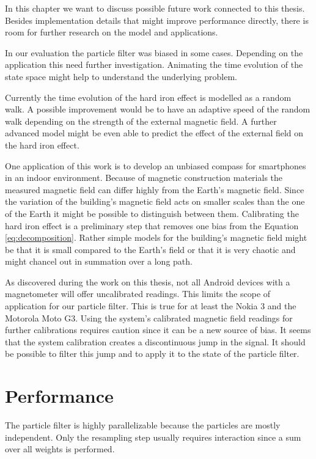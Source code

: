 In this chapter we want to discuss possible future work connected to this thesis. Besides implementation details that might improve performance directly, there is room for further research on the model and applications.

In our evaluation the particle filter was biased in some cases. Depending on the application this need further investigation. Animating the time evolution of the state space might help to understand the underlying problem.

Currently the time evolution of the hard iron effect is modelled as a random walk. A possible improvement would be to have an adaptive speed of the random walk depending on the strength of the external magnetic field. A further advanced model might be even able to predict the effect of the external field on the hard iron effect.

One application of this work is to develop an unbiased compass for smartphones in an indoor environment. Because of magnetic construction materials the measured magnetic field can differ highly from the Earth's magnetic field. Since the variation of the building's magnetic field acts on smaller scales than the one of the Earth it might be possible to distinguish between them. Calibrating the hard iron effect is a preliminary step that removes one bias from the Equation \ref{eq:decomposition}. Rather simple models for the building's magnetic field might be that it is small compared to the Earth's field or that it is very chaotic and might chancel out in summation over a long path.

As discovered during the work on this thesis, not all Android devices with a magnetometer will offer uncalibrated readings. This limits the scope of application for our particle filter. This is true for at least the Nokia 3 and the Motorola Moto G3. Using the system's calibrated magnetic field readings for further calibrations requires caution since it can be a new source of bias. It seems that the system calibration creates a discontinuous jump in the signal. It should be possible to filter this jump and to apply it to the state of the particle filter.

\section{Performance}

The particle filter is highly parallelizable because the particles are mostly independent. Only the resampling step usually requires interaction since a sum over all weights is performed.\cite{parallel_resampling}

